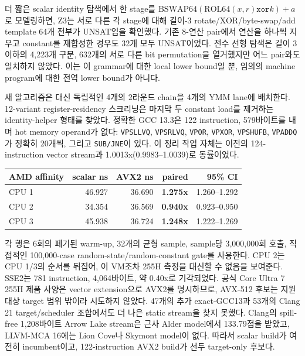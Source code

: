 \documentclass[11pt,a4paper]{article}
\begin{document}
더 짧은 scalar identity 탐색에서 한 stage를
$\mathrm{BSWAP64}(\mathrm{ROL64}(x,r)\mathbin{\mathtt{xor}}k)+a$로
모델링하면, Z3는 서로 다른 각 stage에 대해 길이-3 rotate/XOR/byte-swap/add
template 64개 전부가 UNSAT임을 확인했다.  기존 8-연산 pair에서 연산을
하나씩 지우고 constant를 재합성한 경우도 32개 모두 UNSAT이었다.  전수
선형 탐색은 길이 3 이하의 4,223개 구문, 632개의 서로 다른 bit
permutation을 열거했지만 어느 pair와도 일치하지 않았다.  이는 이
grammar에 대한 local lower bound일 뿐, 임의의 machine program에 대한
전역 lower bound가 아니다.

새 알고리즘은 대신 독립적인 4개의 2라운드 chain을 4개의 YMM lane에
배치한다.  12-variant register-residency 스크리닝은 마지막 두 constant
load를 제거하는 identity-helper 형태를 찾았다.  정확한 GCC 13.3은 122
instruction, 579바이트를 내며 hot memory operand가 없다: \texttt{VPSLLVQ},
\texttt{VPSRLVQ}, \texttt{VPOR}, \texttt{VPXOR}, \texttt{VPSHUFB},
\texttt{VPADDQ}가 정확히 20개씩, 그리고 \texttt{SUB/JNE}이 있다.  이
정리 작업 자체는 이전의 124-instruction vector stream과
1.0013x(0.9983--1.0039)로 동률이었다.

\begin{center}
\small
\begin{tabular}{lrrrr}
\toprule
AMD affinity & scalar ns & AVX2 ns & paired & 95\% CI \\
\midrule
CPU 1 & 46.927 & 36.690 & \textbf{1.275x} & 1.260--1.292 \\
CPU 2 & 34.354 & 36.569 & \textbf{0.940x} & 0.923--0.950 \\
CPU 3 & 45.938 & 36.724 & \textbf{1.248x} & 1.222--1.269 \\
\bottomrule
\end{tabular}
\end{center}

각 행은 6회의 폐기된 warm-up, 32개의 균형 sample, sample당 3,000,000회
호출, 직접적인 100,000-case random-state/random-constant gate를
사용한다.  CPU 2는 CPU 1/3의 순서를 뒤집어, 이 VM조차 255H 측정을
대신할 수 없음을 보여준다.  SSE2는 781 instruction, 4,064바이트, 약
0.40x로 기각되었다.  공식 Core Ultra 7 255H 제품 사양은 vector
extension으로 AVX2를 명시하므로, AVX-512 후보는 지원 대상 target 범위
밖이라 시도하지 않았다.  47개의 추가 exact-GCC13과 53개의
Clang 21 target/scheduler 조합에서도 더 나은 static stream을 찾지
못했다.  Clang의 spill-free 1,208바이트 Arrow Lake stream은 근사 Alder
model에서 133.79점을 받았고, LLVM-MCA 16에는 Lion Cove나 Skymont
model이 없다.  따라서 scalar build가 여전히 incumbent이고, 122-instruction
AVX2 build가 선두 target-only 후보다.
\end{document}
